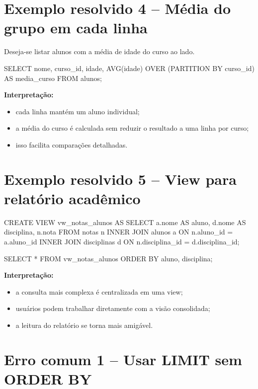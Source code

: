 \section{Exemplo resolvido 4 -- Média do grupo em cada linha}

Deseja-se listar alunos com a média de idade do curso ao lado.

\begin{sqlcode}
SELECT
    nome,
    curso_id,
    idade,
    AVG(idade) OVER (PARTITION BY curso_id) AS media_curso
FROM alunos;
\end{sqlcode}

\textbf{Interpretação:}
\begin{itemize}
    \item cada linha mantém um aluno individual;
    \item a média do curso é calculada sem reduzir o resultado a uma linha por curso;
    \item isso facilita comparações detalhadas.
\end{itemize}

\section{Exemplo resolvido 5 -- View para relatório acadêmico}

\begin{sqlcode}
CREATE VIEW vw_notas_alunos AS
SELECT
    a.nome AS aluno,
    d.nome AS disciplina,
    n.nota
FROM notas n
INNER JOIN alunos a
    ON n.aluno_id = a.aluno_id
INNER JOIN disciplinas d
    ON n.disciplina_id = d.disciplina_id;
\end{sqlcode}

\begin{sqlcode}
SELECT *
FROM vw_notas_alunos
ORDER BY aluno, disciplina;
\end{sqlcode}

\textbf{Interpretação:}
\begin{itemize}
    \item a consulta mais complexa é centralizada em uma view;
    \item usuários podem trabalhar diretamente com a visão consolidada;
    \item a leitura do relatório se torna mais amigável.
\end{itemize}

\section{Erro comum 1 -- Usar LIMIT sem ORDER BY}

